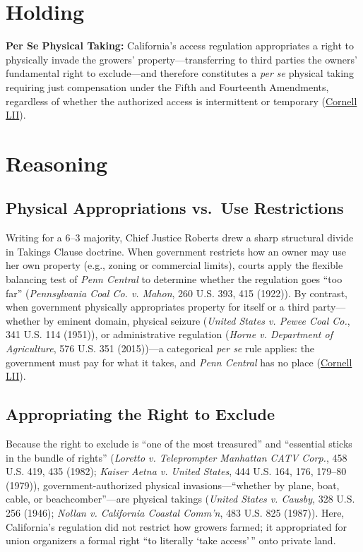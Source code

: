 \documentclass[12pt]{article}
\begin{document}
\section{Holding}

\textbf{Per Se Physical Taking:} California's access regulation appropriates a right to physically invade the growers' property---transferring to third parties the owners' fundamental right to exclude---and therefore constitutes a \emph{per se} physical taking requiring just compensation under the Fifth and Fourteenth Amendments, regardless of whether the authorized access is intermittent or temporary (\href{https://www.law.cornell.edu/supremecourt/text/20-107}{Cornell LII}).

\section{Reasoning}

\subsection{Physical Appropriations vs.\ Use Restrictions}
Writing for a 6--3 majority, Chief Justice Roberts drew a sharp structural divide in Takings Clause doctrine. When government restricts how an owner may use her own property (e.g., zoning or commercial limits), courts apply the flexible balancing test of \textit{Penn Central} to determine whether the regulation goes ``too far'' (\textit{Pennsylvania Coal Co. v. Mahon}, 260 U.S. 393, 415 (1922)). By contrast, when government physically appropriates property for itself or a third party---whether by eminent domain, physical seizure (\textit{United States v. Pewee Coal Co.}, 341 U.S. 114 (1951)), or administrative regulation (\textit{Horne v. Department of Agriculture}, 576 U.S. 351 (2015))---a categorical \emph{per se} rule applies: the government must pay for what it takes, and \textit{Penn Central} has no place (\href{https://www.law.cornell.edu/supremecourt/text/20-107}{Cornell LII}).

\subsection{Appropriating the Right to Exclude}
Because the right to exclude is ``one of the most treasured'' and ``essential sticks in the bundle of rights'' (\textit{Loretto v. Teleprompter Manhattan CATV Corp.}, 458 U.S. 419, 435 (1982); \textit{Kaiser Aetna v. United States}, 444 U.S. 164, 176, 179--80 (1979)), government-authorized physical invasions---``whether by plane, boat, cable, or beachcomber''---are physical takings (\textit{United States v. Causby}, 328 U.S. 256 (1946); \textit{Nollan v. California Coastal Comm'n}, 483 U.S. 825 (1987)). Here, California's regulation did not restrict how growers farmed; it appropriated for union organizers a formal right ``to literally `take access'\,'' onto private land.
\end{document}
